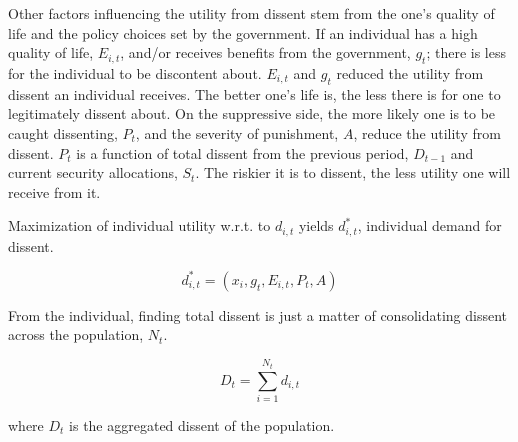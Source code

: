 \documentclass[12pt]{article}
\begin{document}
\begin{spacing}{1.5}

Other factors influencing the utility from dissent stem from the one's quality of life and the policy choices set by the government. If an individual has a high quality of life, $E_{i,t}$, and/or receives benefits from the government, $g_t$; there is less for the individual to be discontent about. $E_{i,t}$ and $g_t$ reduced the utility from dissent an individual receives. The better one's life is, the less there is for one to legitimately dissent about. On the suppressive side, the more likely one is to be caught dissenting, $P_t$, and the severity of punishment, $A$, reduce the utility from dissent. $P_t$ is a function of total dissent from the previous period, $D_{t-1}$ and current security allocations, $S_t$. The riskier it is to dissent, the less utility one will receive from it.  

Maximization of individual utility w.r.t. to $d_{i,t}$ yields $d_{i,t}^*$, individual demand for dissent.  

\vspace{.5 em}
\begin{equation}
d_{i,t}^*=(x_i,g_t,E_{i,t},P_t,A)
\end{equation}

From the individual, finding total dissent is just a matter of consolidating dissent across the population, $N_t$.  

\vspace{.5 em}
\begin{equation}
{D_t}= \sum_{i=1}^{N_{t}} {d_{i,t}}  	
\end{equation}	

\noindent where $D_t$ is the aggregated dissent of the population. %



\end{spacing}
\end{document}
